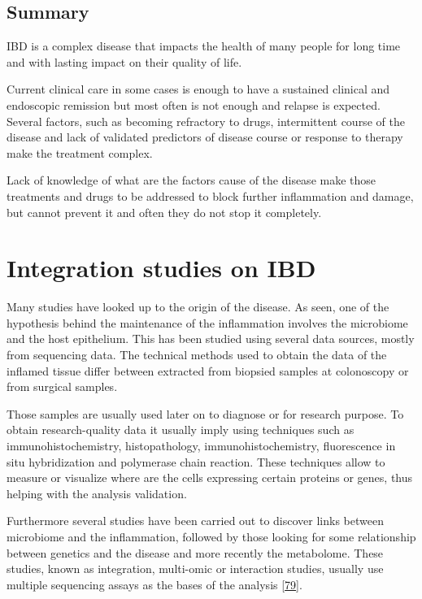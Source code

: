 \documentclass[
  12pt,
  a4paper,
  twoside,
  openright]{book}
\begin{document}
\hypertarget{summary-ibd}{%
\subsection{Summary}\label{summary-ibd}}

IBD is a complex disease that impacts the health of many people for long time and with lasting impact on their quality of life.

Current clinical care in some cases is enough to have a sustained clinical and endoscopic remission but most often is not enough and relapse is expected.
Several factors, such as becoming refractory to drugs, intermittent course of the disease and lack of validated predictors of disease course or response to therapy make the treatment complex.

Lack of knowledge of what are the factors cause of the disease make those treatments and drugs to be addressed to block further inflammation and damage, but cannot prevent it and often they do not stop it completely.

\hypertarget{integration-studies-on-ibd}{%
\section{Integration studies on IBD}\label{integration-studies-on-ibd}}

Many studies have looked up to the origin of the disease.
As seen, one of the hypothesis behind the maintenance of the inflammation involves the microbiome and the host epithelium.
This has been studied using several data sources, mostly from sequencing data.
The technical methods used to obtain the data of the inflamed tissue differ between extracted from biopsied samples at colonoscopy or from surgical samples.

Those samples are usually used later on to diagnose or for research purpose.
To obtain research-quality data it usually imply using techniques such as immunohistochemistry, histopathology, immunohistochemistry, fluorescence in situ hybridization and polymerase chain reaction.
These techniques allow to measure or visualize where are the cells expressing certain proteins or genes, thus helping with the analysis validation.

Furthermore several studies have been carried out to discover links between microbiome and the inflammation, followed by those looking for some relationship between genetics and the disease and more recently the metabolome.
These studies, known as integration, multi-omic or interaction studies, usually use multiple sequencing assays as the bases of the analysis {[}\protect\hyperlink{ref-beck2021}{79}{]}.
\end{document}
